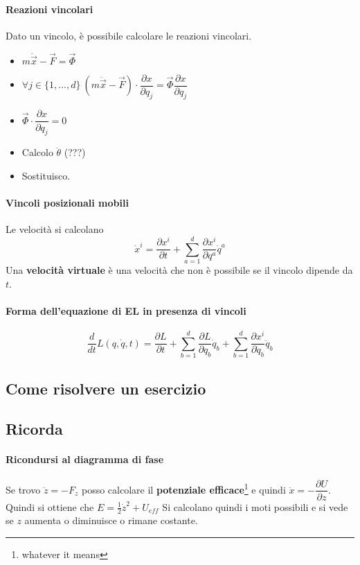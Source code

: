 \documentclass[a4paper,12pt]{article}
\begin{document}
\paragraph{Reazioni vincolari}
Dato un vincolo, è possibile calcolare le reazioni vincolari.
\begin{itemize}
 \item $m\ddot{\vec{x}}-\vec{F} = \vec{\Phi}$
 \item $\forall j \in \{1,...,d\}\ (m\ddot{\vec{x}}-\vec{F})\cdot \dfrac{\partial x}{\partial q_j} = \vec{\Phi}\dfrac{\partial x}{\partial q_j}$
 \item $\vec{\Phi}\cdot\dfrac{\partial x}{\partial q_j}=0$
 \item Calcolo $\ddot{\theta}$ (???)
 \item Sostituisco.
\end{itemize}

\paragraph{Vincoli posizionali mobili}
Le velocità si calcolano
$$
\dot{x}^i = \frac{\partial x^i}{\partial t} + \sum_{a=1}^d \frac{\partial x^i}{\partial q^a} \dot{q}^a
$$
Una \textbf{velocità virtuale} è una velocità che non è possibile se il vincolo dipende da $t$.

\paragraph{Forma dell'equazione di EL in presenza di vincoli}
$$\dfrac{d}{dt}L(q, \dot{q}, t) = \frac{\partial L}{\partial t} + \sum_{b=1}^d \frac{\partial L}{\partial q_b}\dot{q}_b + \sum_{b=1}^d \frac{\partial x^i}{\partial \dot{q}_b} \ddot{q}_b$$

\subsection{Come risolvere un esercizio}

\subsection{Ricorda}

\paragraph{Ricondursi al diagramma di fase}
Se trovo $\ddot{z} = -F_z$ posso calcolare il \textbf{potenziale efficace}\footnote{whatever it means} e quindi $\ddot{x} = -\dfrac{\partial U}{\partial z}$. Quindi si ottiene che $E = \frac{1}{2}\dot{z}^2 + U_{eff}$
Si calcolano quindi i moti possibili e si vede se $z$ aumenta o diminuisce o rimane costante.
\end{document}
